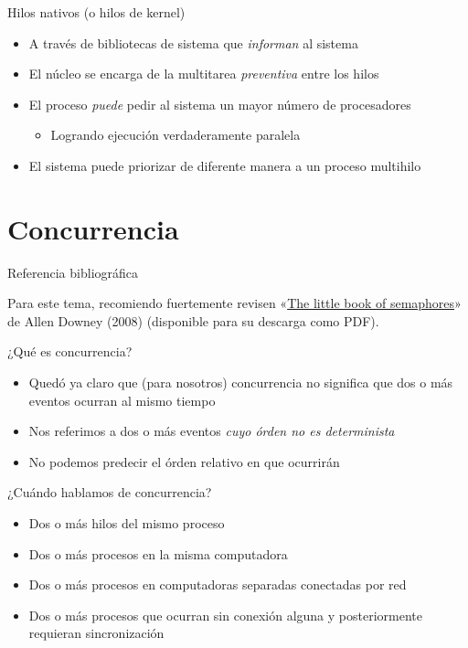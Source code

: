 \documentclass[presentation]{beamer}
\begin{document}
\begin{frame}[label={sec:org434ed52}]{Hilos nativos (o hilos de kernel)}
\begin{itemize}
\item A través de bibliotecas de sistema que \emph{informan} al sistema
\item El núcleo se encarga de la multitarea \emph{preventiva} entre los hilos
\item El proceso \emph{puede} pedir al sistema un mayor número de procesadores
\begin{itemize}
\item Logrando ejecución verdaderamente paralela
\end{itemize}
\item El sistema puede priorizar de diferente manera a un proceso
multihilo
\end{itemize}
\end{frame}

\section{Concurrencia}
\label{sec:org3ef014b}

\begin{frame}[label={sec:org840bb7d}]{Referencia bibliográfica}
\begin{center}
Para este tema, recomiendo fuertemente revisen «\href{http://greenteapress.com/semaphores/LittleBookOfSemaphores.pdf}{The little book of
semaphores}» de Allen Downey (2008) (disponible para su descarga como
PDF).
\end{center}
\end{frame}

\begin{frame}[label={sec:orge1ed841}]{¿Qué es concurrencia?}
\begin{itemize}
\item Quedó ya claro que (para nosotros) concurrencia no significa que dos
o más eventos ocurran al mismo tiempo
\item Nos referimos a dos o más eventos \emph{cuyo órden no es determinista}
\item No podemos predecir el órden relativo en que ocurrirán
\end{itemize}
\end{frame}

\begin{frame}[label={sec:orgbc050d8}]{¿Cuándo hablamos de concurrencia?}
\begin{itemize}
\item Dos o más hilos del mismo proceso
\item Dos o más procesos en la misma computadora
\item Dos o más procesos en computadoras separadas conectadas por red
\item Dos o más procesos que ocurran sin conexión alguna y posteriormente
requieran sincronización
\end{itemize}
\end{frame}
\end{document}
